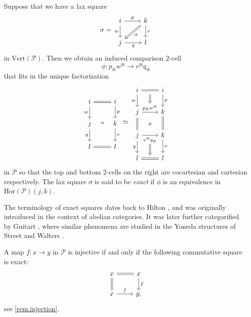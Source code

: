 \documentclass[a4paper, 11pt]{amsart}
\numberwithin{theorem}{section}
\theoremstyle{definition}
\renewcommand{\P}{\mathscr{P}}
\renewcommand{\Vert}{\mathrm{Vert}}
\newcommand{\Hor}{\mathrm{Hor}}
\begin{document}
\begin{definition}\label{def.exact-squares}
	Suppose that we have a lax square
	\[
		\sigma = \begin{tikzcd}
			i \arrow[r, "p"]\arrow[d,"w"'] &|[alias=f]| k \arrow[d, "v"] \\ 
			|[alias=t]|j \arrow[r, "q"'] & l 
			\arrow[from=f,to=t, Rightarrow, "\alpha"]
		\end{tikzcd}
	\]
	in $\Vert(\P)$. Then we obtain an induced comparison 2-cell 
	$$
	\phi : p_\circledast w^\circledast \rightarrow v^\circledast q_\circledast
	$$
	that fits in the unique factorization 
	\[
		\begin{tikzcd}
			i \arrow[r, equal, ""name=f]\arrow[d,"w"'] & i \arrow[d, "p"]\\
			j\arrow[d,"q"'] & k\arrow[d, "v"] \\
			l \arrow[r, equal, ""name=t] & l
			\arrow[from=f, to=t, "\scriptstyle\alpha", phantom]
		\end{tikzcd}
		\simeq 
		\begin{tikzcd}
			i \arrow[r, equal, ""name=h1]\arrow[d,"w"'] & i \arrow[d, "p"]\\
			j \arrow[r, "p_\circledast w^\circledast"name=h2]\arrow[d,equal] & k\arrow[d,equal]\\
			j \arrow[r, "v^\circledast q_\circledast"'name=h3]\arrow[d,"q"'] & k \arrow[d,"v"]\\
			l \arrow[r, equal, ""name=h4] & l
			\arrow[from=h1,to=h2,Rightarrow, shorten <= 6pt]
			\arrow[from=h2,to=h3, "\scriptstyle\phi", phantom]
			\arrow[from=h3,to=h4,Rightarrow]
		\end{tikzcd}		
	\]
	in $\P$
	so that the top and bottom 2-cells on the right are cocartesian and cartesian respectively. 
	The lax square $\sigma$ is said to be \textit{exact} if $\phi$
	is an equivalence in $\Hor(\P)(j,k)$.
\end{definition}

\begin{remark}	
The terminology of exact squares dates back to Hilton \cite{Hilton}, and was originally introduced in the context 
of abelian categories. It was later 
further categorified by Guitart \cite[Section 4]{Guitart}, where similar phenomena  are studied in the Yoneda structures of Street and Walters \cite{StreetWalters}. 
\end{remark}


\begin{example}
	A map $f : x \rightarrow y$ in $\P$ is injective if and only if the following commutative square is exact:
	\[
		\begin{tikzcd}
			x \arrow[r ,equal]\arrow[d,equal] & x \arrow[d,"f"]\\
			x \arrow[r, "f"] & y,
		\end{tikzcd}
	\]
	see \cref{rem.injection}.
\end{example}
\end{document}
